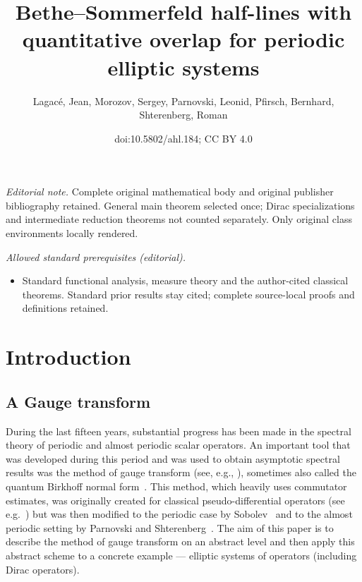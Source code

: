 \documentclass[10pt]{amsart}
\title{Bethe–Sommerfeld half-lines with quantitative overlap for periodic elliptic systems}
\author{Lagacé, Jean, Morozov, Sergey, Parnovski, Leonid, Pfirsch, Bernhard, Shterenberg, Roman}
\date{doi:10.5802/ahl.184; CC BY 4.0}
\theoremstyle{definition}\newtheorem{defi}[theo]{Definition}\newtheorem{rema}[theo]{Remark}\newtheorem{exam}[theo]{Example}\newtheorem{nota}[theo]{Notation}
\begin{document}
\maketitle
\noindent\textit{Editorial note.} Complete original mathematical body and original publisher bibliography retained. General main theorem selected once; Dirac specializations and intermediate reduction theorems not counted separately. Only original class environments locally rendered.\par\medskip
\noindent\textit{Allowed standard prerequisites (editorial).}\begin{itemize}
\item Standard functional analysis, measure theory and the author-cited classical theorems. Standard prior results stay cited; complete source-local proofs and definitions retained.
\end{itemize}\medskip
\tableofcontents


\section{Introduction}



\subsection{A Gauge transform}

During the last fifteen years, substantial progress has been made in the spectral theory of periodic and almost periodic scalar operators. An important tool that was developed during this period and was used to obtain asymptotic spectral results was the method of gauge transform (see, e.g., \cite{Ivrii2018,MorParSht2014,ParSob2010,
ParSht2012,
ParSht2016,ParSht2019,Sobolev2005,Sobolev2006}), sometimes also called the quantum Birkhoff normal form~\cite{LaurentVuNgoc}. This method, which heavily uses commutator estimates, was originally created for classical pseudo-differential operators (see e.g.~\cite{Rozenbljum1978,Weinstein1977}) but was then modified to the periodic case by Sobolev~\cite{Sobolev2005,Sobolev2006} and to the almost periodic setting by Parnovski and Shterenberg~\cite{ParSht2012}. The aim of this paper is to describe the method of gauge transform on an abstract level and then apply this abstract scheme to a concrete example --- elliptic systems of operators (including Dirac operators).
\end{document}
